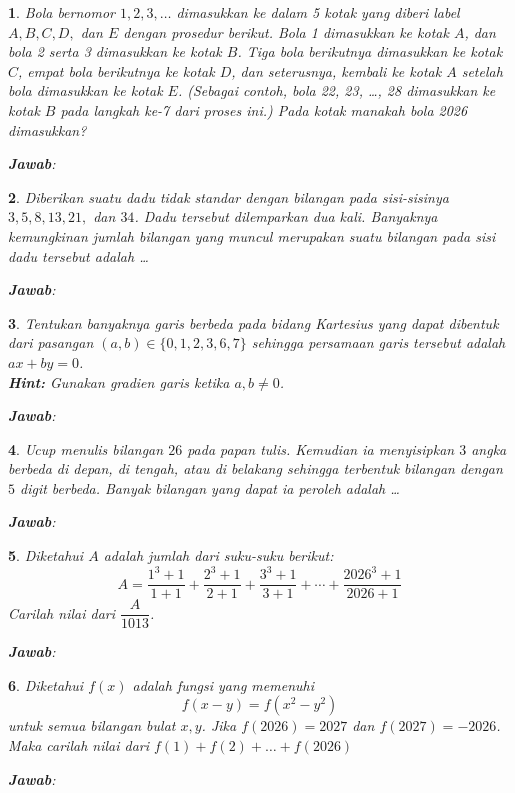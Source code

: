 \documentclass[11pt,a4paper,DIV=12]{scrartcl}
\newcommand\answerbox{%
\vspace*{0.5cm}%
\noindent\textbf{\textsf{Jawab}}: \fbox{\rule{14cm}{0pt}\rule[-0.2ex]{0pt}{1.9ex}}}
\theoremstyle{problemstyle}
\newtheorem{problem}{}
\theoremstyle{answerstyle}
\begin{document}
\begin{problem}
  Bola bernomor $1, 2, 3, \ldots$ dimasukkan ke dalam 5 kotak yang diberi label $A, B, C, D,$ dan $E$ dengan prosedur berikut. Bola 1 dimasukkan ke kotak $A$, dan bola 2 serta 3 dimasukkan ke kotak $B$. Tiga bola berikutnya dimasukkan ke kotak $C$, empat bola berikutnya ke kotak $D$, dan seterusnya, kembali ke kotak $A$ setelah bola dimasukkan ke kotak $E$. (Sebagai contoh, bola 22, 23, \ldots, 28 dimasukkan ke kotak $B$ pada langkah ke-7 dari proses ini.) Pada kotak manakah bola 2026 dimasukkan?

  \answerbox
\end{problem}

\begin{problem}
  Diberikan suatu dadu tidak standar dengan bilangan pada sisi-sisinya $3, 5, 8, 13, 21,$ dan $34$. Dadu tersebut dilemparkan dua kali. Banyaknya kemungkinan jumlah bilangan yang muncul merupakan suatu bilangan pada sisi dadu tersebut adalah \ldots

  \answerbox
\end{problem}

\begin{problem}
  Tentukan banyaknya garis berbeda pada bidang Kartesius yang dapat dibentuk dari pasangan $(a,b) \in \{0,1,2,3,6,7\}$ sehingga persamaan garis tersebut adalah
  $ax + by = 0$.\\
  \textbf{Hint:} Gunakan gradien garis ketika $a,b \neq 0$.

  \answerbox
\end{problem}

\begin{problem}
  Ucup menulis bilangan $26$ pada papan tulis. Kemudian ia menyisipkan $3$ angka berbeda di depan, di tengah, atau di belakang sehingga terbentuk bilangan dengan $5$ digit berbeda.
  Banyak bilangan yang dapat ia peroleh adalah \ldots

  \answerbox
\end{problem}

\begin{problem}
  Diketahui $A$ adalah jumlah dari suku-suku berikut:
  $$A = \frac{1^3 + 1}{1 + 1} + \frac{2^3 + 1}{2 + 1} + \frac{3^3 + 1}{3 + 1} + \cdots + \frac{2026^3 + 1}{2026 + 1}$$
  Carilah nilai dari $\dfrac{A}{1013}$.

  \answerbox
\end{problem}

\begin{problem}
  Diketahui $f(x)$ adalah fungsi yang memenuhi
  $$f(x-y) = f(x^2-y^2)$$
  untuk semua bilangan bulat $x, y$. Jika $f(2026) = 2027$ dan $f(2027) = -2026$. Maka carilah nilai dari $f(1) + f(2) + \dots + f(2026)$

  \answerbox
\end{problem}
\end{document}
